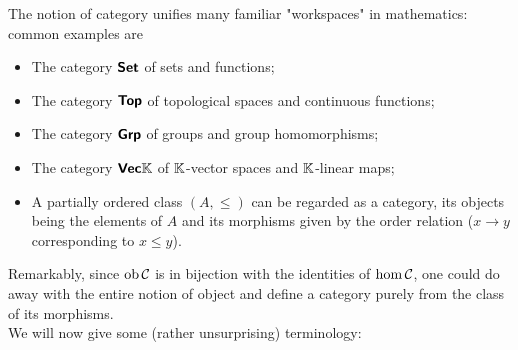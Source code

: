 \documentclass{article}
\begin{document}
The notion of category unifies many familiar "workspaces" in mathematics: common examples are\begin{itemize}
    \item The category $\text{\sffamily\textbf{Set}}$ of sets and functions;
    \item The category $\text{\sffamily\textbf{Top}}$ of topological spaces and continuous functions;
    \item The category $\text{\sffamily\textbf{Grp}}$ of groups and group homomorphisms;
    \item The category $\text{\sffamily\textbf{Vec}}\mathbb{K}$ of $\mathbb{K}$-vector spaces and $\mathbb{K}$-linear maps;
    \item A partially ordered class $(A, \le)$ can be regarded as a category, its objects being the elements of $A$ and its morphisms given by the order relation ($x\to y$ corresponding to $x\le y$).
\end{itemize}
Remarkably, since $\operatorname{ob}\mathcal{C}$ is in bijection with the identities of $\hom\mathcal{C}$, one could do away with the entire notion of object and define a category purely from the class of its morphisms.\\
We will now give some (rather unsurprising) terminology:
\end{document}
